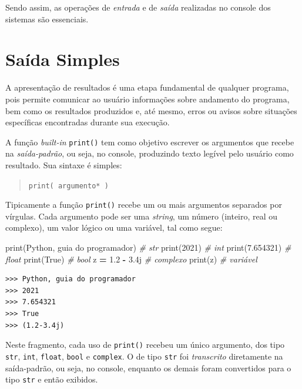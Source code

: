 \documentclass[
]{book}
\newenvironment{Shaded}{\begin{snugshade}}{\end{snugshade}}
\newcommand{\BuiltInTok}[1]{#1}
\newcommand{\CommentTok}[1]{\textcolor[rgb]{0.56,0.35,0.01}{\textit{#1}}}
\newcommand{\DecValTok}[1]{\textcolor[rgb]{0.00,0.00,0.81}{#1}}
\newcommand{\FloatTok}[1]{\textcolor[rgb]{0.00,0.00,0.81}{#1}}
\newcommand{\NormalTok}[1]{#1}
\newcommand{\OperatorTok}[1]{\textcolor[rgb]{0.81,0.36,0.00}{\textbf{#1}}}
\newcommand{\OtherTok}[1]{\textcolor[rgb]{0.56,0.35,0.01}{#1}}
\newcommand{\StringTok}[1]{\textcolor[rgb]{0.31,0.60,0.02}{#1}}
\newcommand{\VariableTok}[1]{\textcolor[rgb]{0.00,0.00,0.00}{#1}}
\begin{document}
Sendo assim, as operações de \emph{entrada} e de \emph{saída} realizadas no console dos sistemas são essenciais.

\hypertarget{e-s-saida}{%
\section{Saída Simples}\label{e-s-saida}}

A apresentação de resultados é uma etapa fundamental de qualquer programa, pois permite comunicar ao usuário informações sobre andamento do programa, bem como os resultados produzidos e, até mesmo, erros ou avisos sobre situações específicas encontradas durante sua execução.

A função \emph{built-in} \texttt{print()} tem como objetivo escrever os argumentos que recebe na \emph{saída-padrão}, ou seja, no console, produzindo texto legível pelo usuário como resultado. Sua sintaxe é simples:

\begin{quote}
\texttt{print(\ argumento*\ )}
\end{quote}

Tipicamente a função \texttt{print()} recebe um ou mais argumentos separados por vírgulas. Cada argumento pode ser uma \emph{string}, um número (inteiro, real ou complexo), um valor lógico ou uma variável, tal como segue:

\begin{Shaded}
\begin{Highlighting}[]
\BuiltInTok{print}\NormalTok{(}\StringTok{\textquotesingle{}Python, guia do programador\textquotesingle{}}\NormalTok{) }\CommentTok{\# str}
\BuiltInTok{print}\NormalTok{(}\DecValTok{2021}\NormalTok{) }\CommentTok{\# int}
\BuiltInTok{print}\NormalTok{(}\FloatTok{7.654321}\NormalTok{) }\CommentTok{\# float}
\BuiltInTok{print}\NormalTok{(}\VariableTok{True}\NormalTok{) }\CommentTok{\# bool}
\NormalTok{z }\OperatorTok{=} \FloatTok{1.2} \OperatorTok{{-}} \OtherTok{3.4j} \CommentTok{\# complexo}
\BuiltInTok{print}\NormalTok{(z) }\CommentTok{\# variável}
\end{Highlighting}
\end{Shaded}

\begin{verbatim}
>>> Python, guia do programador
>>> 2021
>>> 7.654321
>>> True
>>> (1.2-3.4j)
\end{verbatim}

Neste fragmento, cada uso de \texttt{print()} recebeu um único argumento, dos tipo \texttt{str}, \texttt{int}, \texttt{float}, \texttt{bool} e \texttt{complex}. O de tipo \texttt{str} foi \emph{transcrito} diretamente na saída-padrão, ou seja, no console, enquanto os demais foram convertidos para o tipo \texttt{str} e então exibidos.
\end{document}

